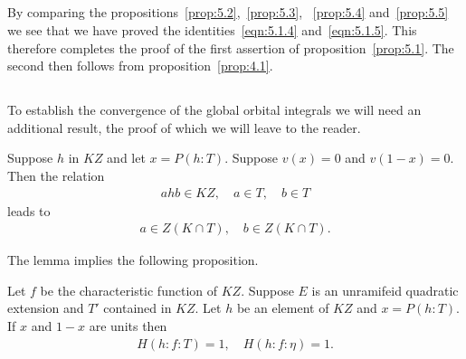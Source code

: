 \subsection{}
By comparing the propositions~\eqref{prop:5.2},~\eqref{prop:5.3}, 
~\eqref{prop:5.4} and~\eqref{prop:5.5} we see that we have proved the identities~\eqref{eqn:5.1.4} and~\eqref{eqn:5.1.5}.
This therefore completes the proof of the first assertion of proposition~\eqref{prop:5.1}.
The second then follows from proposition~\eqref{prop:4.1}.

\subsection{}
To establish the convergence of the global orbital integrals we will need an additional result, the proof of which we will leave to the reader.

\begin{lemma}
Suppose $h$ in $KZ$ and let $x = P(h:T)$.
Suppose $v(x) = 0$ and $v(1-x)=0$.
Then the relation
\begin{align*}
ahb \in KZ, \quad a \in T, \quad b \in T
\end{align*}
leads to
\begin{align*}
a \in Z(K \cap T), \quad b \in Z(K \cap T).
\end{align*}
\end{lemma}
The lemma implies the following proposition.
\begin{proposition}
Let $f$ be the characteristic function of $KZ$.
Suppose $E$ is an unramifeid quadratic extension and $T'$ contained in $KZ$.
Let $h$ be an element of $KZ$ and $x = P(h:T)$.
If $x$ and $1-x$ are units then
\begin{align*}
H(h:f:T) =1, \quad H(h:f:\eta) = 1.
\end{align*}
\end{proposition}